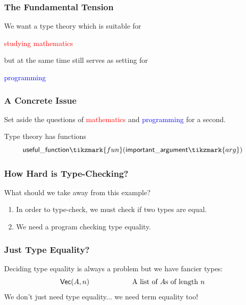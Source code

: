 \documentclass[usenames,dvipsnames,aspectratio=169,12pt]{beamer}
\begin{document}
\begin{frame}
  \frametitle{The Fundamental Tension}

  We want a type theory which is suitable for

  \begin{center}
    \textcolor{Red}{studying mathematics}
  \end{center}

  but at the same time still serves as setting for

  \begin{center}
    \textcolor{Blue}{programming}
  \end{center}

\end{frame}

\begin{frame}
  \frametitle{A Concrete Issue}
  Set aside the questions of \textcolor{Red}{mathematics} and \textcolor{Blue}{programming} for a
  second.
  \bigskip

  Type theory has functions
  \[
    \App{\Lang{useful\_function}\tikzmark{fun}}{\Lang{important\_argument}\tikzmark{arg}}
  \]
\end{frame}

\begin{frame}
  \frametitle{How Hard is Type-Checking?}
  What should we take away from this example?
  \begin{enumerate}
  \item In order to type-check, we must check if two types are equal.
  \item We need a program checking type equality.
  \end{enumerate}
\end{frame}

\begin{frame}
  \frametitle{Just Type Equality?}
  Deciding type equality is always a problem but we have fancier types:
  \[
    \mathsf{Vec}(A, n) \qquad\quad\qquad\quad\text{A list of $A$s of length $n$}
  \]
  \pause
  We don't just need type equality... we need term equality too!
\end{frame}
\end{document}
